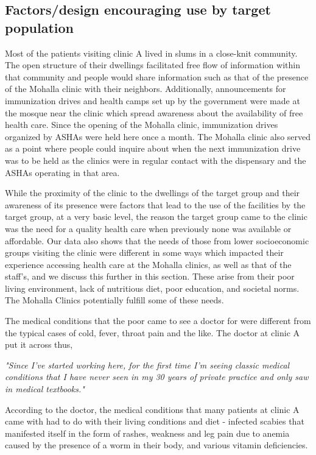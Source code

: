 \subsection{Factors/design encouraging use by target population}
Most of the patients visiting clinic A lived in slums in a close-knit community. The open structure of their dwellings facilitated free flow of information within that community and people would share information such as that of the presence of the Mohalla clinic with their neighbors. Additionally, announcements for immunization drives and health camps set up by the government were made at the mosque near the clinic which spread awareness about the availability of free health care. Since the opening of the Mohalla clinic, immunization drives organized by ASHAs were held here once a month. The Mohalla clinic also served as a point where people could inquire about when the next immunization drive was to be held as the clinics were in regular contact with the dispensary and the ASHAs operating in that area.

While the proximity of the clinic to the dwellings of the target group and their awareness of its presence were factors that lead to the use of the facilities by the target group, at a very basic level, the reason the target group came to the clinic was the need for a quality health care when previously none was available or affordable. Our data also shows that the needs of those from lower socioeconomic groups visiting the clinic were different in some ways which impacted their experience accessing health care at the Mohalla clinics, as well as that of the staff's, and we discuss this further in this section. These arise from their poor living environment, lack of nutritious diet, poor education, and societal norms. The Mohalla Clinics potentially fulfill some of these needs.

The medical conditions that the poor came to see a doctor for were different from the typical cases of cold, fever, throat pain and the like. The doctor at clinic A put it across thus,

\textit{"Since I've started working here, for the first time I'm seeing classic medical conditions that I have never seen in my 30 years of private practice and only saw in medical textbooks."}

According to the doctor, the medical conditions that many patients at clinic A came with had to do with their living conditions and diet - infected scabies that manifested itself in the form of rashes, weakness and leg pain due to anemia caused by the presence of a worm in their body, and various vitamin deficiencies.

